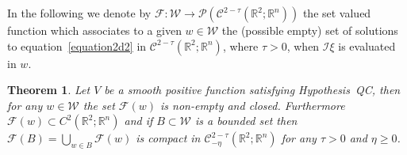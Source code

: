 \documentclass[a4paper,10pt]{article}
\newtheorem{theorem}{Theorem}
\begin{document}
In the following we denote by $\mathcal{F} : \mathcal{W} \rightarrow
\mathcal{P} (\mathcal{C}^{2 - \tau} (\mathbb{R}^2 ; \mathbb{R}^n))$ the set
valued function which associates to a given $w \in \mathcal{W}$ the (possible
empty) set of solutions to equation~{\eqref{equation2d2}} in $\mathcal{C}^{2 -
\tau} (\mathbb{R}^2 ; \mathbb{R}^n)$, where $\tau > 0$, when $\mathcal{I} \xi$
is evaluated in $w$.

\begin{theorem}
  \label{theorem_existence1}Let $V$ be a smooth positive function satisfying
  Hypothesis~QC, then for any $w \in \mathcal{W}$ the set $\mathcal{F} (w)$ is
  non-empty and closed. Furthermore $\mathcal{F} (w) \subset C^2 (\mathbb{R}^2
  ; \mathbb{R}^n)$ and if $B \subset \mathcal{W}$ is a bounded set then
  $\mathcal{F} (B) = \bigcup_{w \in B} \mathcal{F} (w)$ is compact in
  $\mathcal{C}_{- \eta}^{2 - \tau} (\mathbb{R}^2 ; \mathbb{R}^n)$ for any
  $\tau > 0$ and $\eta \geqslant 0$.
\end{theorem}
\end{document}
